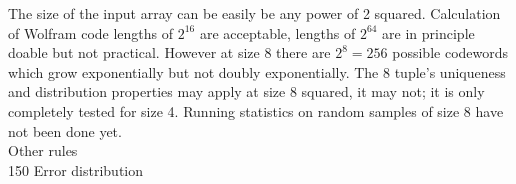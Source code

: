 \documentclass[11pt]{article}
\begin{document}
The size of the input array can be easily be any power of 2 squared. Calculation of Wolfram code lengths of $2^{16}$ are acceptable, lengths of $2^{64}$ are in principle doable but not practical. However at size 8 there are $2^8=256$ possible codewords which grow exponentially but not doubly exponentially. The 8 tuple's uniqueness and distribution properties may apply at size 8 squared, it may not; it is only completely tested for size 4. Running statistics on random samples of size 8 have not been done yet.\\

Other rules\\

150 Error distribution\\



\end{document}
